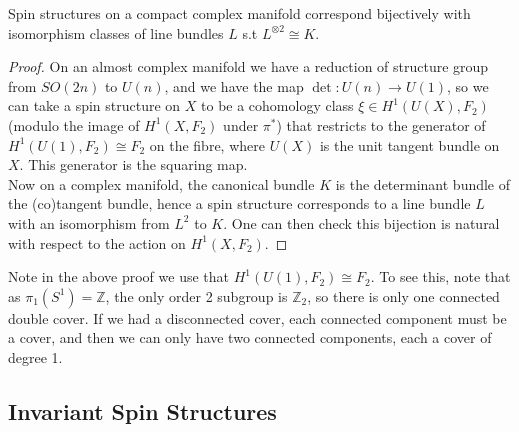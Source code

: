 \documentclass{article}
\begin{document}
\begin{prop}
	Spin structures on a compact complex manifold correspond bijectively with isomorphism classes of line bundles $L$ s.t $L^{\otimes 2}\cong K$. 
\end{prop}
\begin{proof}
	On an almost complex manifold we have a reduction of structure group from $SO(2n)$ to $U(n)$, and we have the map $\det:U(n) \to U(1)$, so we can take a spin structure on $X$ to be a cohomology class $\xi \in H^1(U(X),F_2)$ (modulo the image of $H^1(X,F_2)$ under $\pi^\ast$) that restricts to the generator of $H^1(U(1),F_2)\cong F_2$ on the fibre, where $U(X)$ is the unit tangent bundle on $X$. This generator is the squaring map. \\
	Now on a complex manifold, the canonical bundle $K$ is the determinant bundle of the (co)tangent bundle, hence a spin structure corresponds to a line bundle $L$ with an isomorphism from $L^2$ to $K$. One can then check this bijection is natural with respect to the action on $H^1(X, F_2)$. 
	
	
\end{proof}

\begin{remark}
	Note in the above proof we use that $H^1(U(1), F_2)\cong F_2$. To see this, note that as $\pi_1(S^1)= \mathbb{Z}$, the only order 2 subgroup is $\mathbb{Z}_2$, so there is only one connected double cover. If we had a disconnected cover, each connected component must be a cover, and then we can only have two connected components, each a cover of degree 1. 
\end{remark}

\subsection{Invariant Spin Structures}
\end{document}
